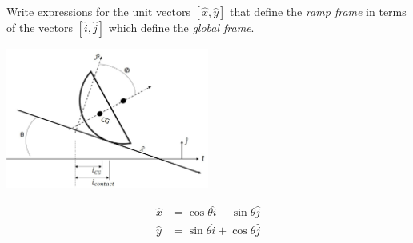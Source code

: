 Write expressions for the unit vectors $\left[\hat{x}, \hat{y}\right]$ that define the \textit{ramp frame} in terms of the vectors $\left[\hat{i}, \hat{j}\right]$ which define the \textit{global frame}.

\begin{center}
    \includegraphics[width=0.5\textwidth]{img/ducky_ramp.png}
\end{center}

\begin{solution}
\begin{align*}
    \hat{x} &= \cos{\theta} \hat{i} - \sin{\theta} \hat{j} \\
    \hat{y} &= \sin{\theta} \hat{i} + \cos{\theta} \hat{j}
\end{align*}
\end{solution}